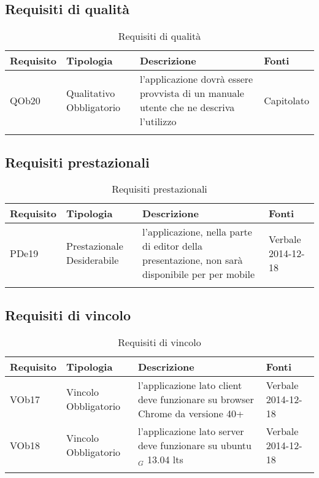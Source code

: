 \subsection{ Requisiti di qualità}
	
\begin{longtable}{|l|p{2.5cm}|p{5cm}|p{3.5cm}|}
\hline
\textbf{Requisito} & \textbf{Tipologia} & \textbf{Descrizione} & \textbf{Fonti} \\
\hline
QOb20 & Qualitativo \linebreak Obbligatorio & l'applicazione dovrà essere provvista di un manuale utente che ne descriva l'utilizzo & Capitolato \linebreak \\
\hline
\caption{Requisiti di qualità}
\end{longtable}
\subsection{ Requisiti prestazionali}
	
\begin{longtable}{|l|p{2.5cm}|p{5cm}|p{3.5cm}|}
\hline
\textbf{Requisito} & \textbf{Tipologia} & \textbf{Descrizione} & \textbf{Fonti} \\
\hline
PDe19 & Prestazionale \linebreak Desiderabile & l'applicazione, nella parte di editor della presentazione, non sarà disponibile per per mobile & Verbale 2014-12-18 \linebreak \\
\hline
\caption{Requisiti prestazionali}
\end{longtable}
\subsection{ Requisiti di vincolo}
	
\begin{longtable}{|l|p{2.5cm}|p{5cm}|p{3.5cm}|}
\hline
\textbf{Requisito} & \textbf{Tipologia} & \textbf{Descrizione} & \textbf{Fonti} \\
\hline
VOb17 & Vincolo \linebreak Obbligatorio & l'applicazione lato client deve funzionare su browser Chrome da versione 40+ & Verbale 2014-12-18 \linebreak \\
\hline
VOb18 & Vincolo \linebreak Obbligatorio & l'applicazione lato server deve funzionare su ubuntu$_G$ 13.04 lts & Verbale 2014-12-18 \linebreak \\
\hline
\caption{Requisiti di vincolo}
\end{longtable}

